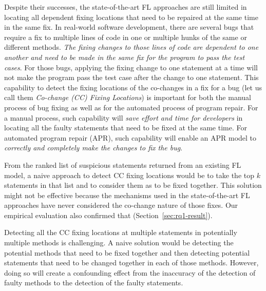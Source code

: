 Despite their successes, the state-of-the-art FL approaches are still
limited in locating all dependent fixing locations that need to be
repaired at the same time in the same fix. In real-world software
development, there are several bugs that require a fix to multiple
lines of code in one or multiple hunks of the same or different
methods. {\em The fixing changes to those lines of code are dependent
  to one another and need to be made in the same fix for the program
  to pass the test cases}. For those bugs, applying the fixing change
to one statement at a time will not make the program pass the test
case after the change to one statement.
%
This capability to detect the fixing locations of the co-changes in a
fix for a bug (let us call them {\em Co-change (CC) Fixing Locations})
is important for both the manual process of bug fixing as well as for
the automated process of program repair. For a manual process, such
capability will {\em save effort and time for developers} in locating all
the faulty statements that need to be fixed at the same time. For
automated program repair (APR), such capability will enable an APR
model to {\em correctly and completely make the changes to fix the bug}.

From the ranked list of suspicious statements returned from an
existing FL model, a naive approach to detect CC fixing locations would
be to take the top $k$ statements in that list and to consider them as
to be fixed together. This solution might not be effective
because the mechanisms used in the state-of-the-art FL approaches have
never considered the co-change nature of those fixes. Our empirical
evaluation also confirmed that (Section~\ref{sec:rq1-result}).

Detecting all the CC fixing locations at multiple statements in
potentially multiple methods is challenging. A naive solution would be
detecting the potential methods that need to be fixed together and
then detecting potential statements that need to be changed together
in each of those methods. However, doing so will create a confounding
effect from the inaccuracy of the detection of faulty methods to the
detection of the faulty statements.

